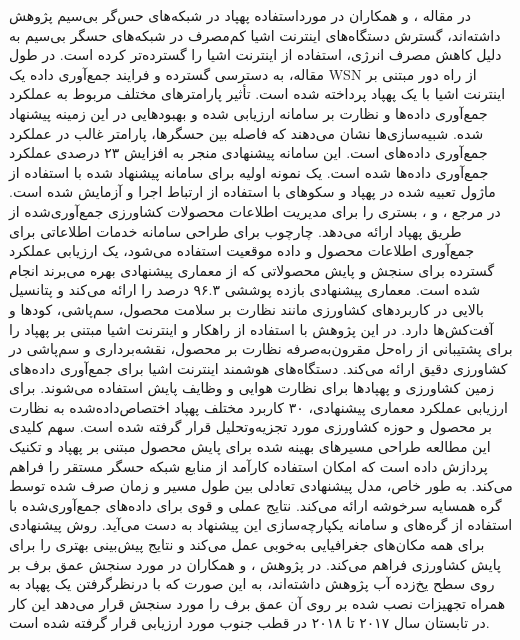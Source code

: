 در مقاله \cite{Samarakkody2021}،  و همکاران در مورداستفاده پهپاد در شبکه‌های حس‌گر بی‌سیم پژوهش داشته‌اند، گسترش دستگاه‌های اینترنت اشیا کم‌مصرف در شبکه‌های حسگر بی‌سیم به دلیل کاهش مصرف انرژی، استفاده از اینترنت اشیا را گسترده‌تر کرده است. در طول مقاله، به دسترسی گسترده و فرایند جمع‌آوری داده یک \gls{WSN} از راه دور مبتنی بر اینترنت اشیا با یک پهپاد پرداخته شده است. تأثیر پارامترهای مختلف مربوط به عملکرد جمع‌آوری داده‌ها و نظارت بر سامانه  ارزیابی شده و بهبودهایی در این زمینه پیشنهاد شده. شبیه‌سازی‌ها نشان می‌دهند که فاصله بین حسگرها، پارامتر غالب در عملکرد جمع‌آوری داده‌های  است. این سامانه پیشنهادی منجر به افزایش ۲۳ درصدی عملکرد جمع‌آوری داده‌ها شده است. یک نمونه اولیه برای سامانه پیشنهاد شده با استفاده از ماژول  تعبیه شده در پهپاد  و سکوهای  با استفاده از ارتباط  اجرا و آزمایش شده است.
در مرجع \cite{Singh2022}،  و ، بستری را برای مدیریت اطلاعات محصولات کشاورزی جمع‌آوری‌شده از طریق پهپاد ارائه می‌دهد. چارچوب  برای طراحی سامانه خدمات اطلاعاتی برای جمع‌آوری اطلاعات محصول و داده موقعیت استفاده می‌شود، یک ارزیابی عملکرد گسترده برای سنجش و پایش محصولاتی که از معماری پیشنهادی بهره می‌برند انجام شده است. معماری پیشنهادی بازده پوششی ۹۶.۳ درصد را ارائه می‌کند و پتانسیل بالایی در کاربردهای کشاورزی مانند نظارت بر سلامت محصول، سم‌پاشی، کودها و آفت‌کش‌ها دارد.
در این پژوهش با استفاده از راهکار  و اینترنت اشیا مبتنی بر پهپاد را برای پشتیبانی از راه‌حل مقرون‌به‌صرفه نظارت بر محصول، نقشه‌برداری و سم‌پاشی در کشاورزی دقیق ارائه می‌کند. دستگاه‌های هوشمند اینترنت اشیا برای جمع‌آوری داده‌های زمین کشاورزی و پهپادها برای نظارت هوایی و وظایف پایش استفاده می‌شوند. برای ارزیابی عملکرد معماری پیشنهادی، ۳۰ کاربرد مختلف پهپاد اختصاص‌داده‌شده به نظارت بر محصول و حوزه کشاورزی مورد تجزیه‌وتحلیل قرار گرفته شده است. سهم کلیدی این مطالعه طراحی مسیرهای بهینه شده برای پایش محصول مبتنی بر پهپاد و تکنیک پردازش داده است که امکان استفاده کارآمد از منابع شبکه حسگر مستقر را فراهم می‌کند. به طور خاص، مدل پیشنهادی تعادلی بین طول مسیر و زمان صرف شده توسط گره همسایه سرخوشه ارائه می‌کند. نتایج عملی و قوی برای داده‌های جمع‌آوری‌شده با استفاده از گره‌های  و سامانه یکپارچه‌سازی  این پیشنهاد به دست می‌آید. روش پیشنهادی برای همه مکان‌های جغرافیایی به‌خوبی عمل می‌کند و نتایج پیش‌بینی بهتری را برای پایش کشاورزی فراهم می‌کند.
در پژوهش \cite{Tan2021a}،  و همکاران در مورد سنجش عمق برف بر روی سطح یخ‌زده آب پژوهش داشته‌اند، به این صورت که با درنظرگرفتن یک پهپاد به همراه تجهیزات نصب شده بر روی آن عمق برف را مورد سنجش قرار می‌دهد این کار در تابستان سال ۲۰۱۷ تا ۲۰۱۸ در قطب جنوب مورد ارزیابی قرار گرفته شده است.
